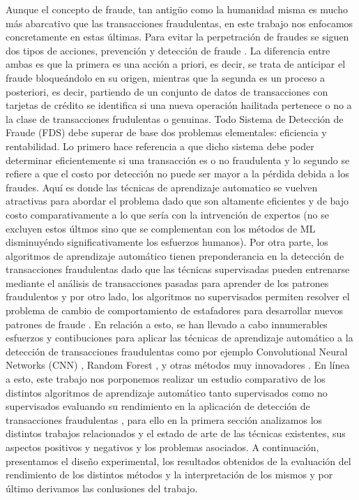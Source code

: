 \documentclass[11pt,a4paper]{article}
\begin{document}
Aunque el concepto de fraude, tan antig\"uo como la humanidad misma es mucho m\'as abarcativo que las transacciones fraudulentas, en este trabajo nos enfocamos concretamente en estas \'ultimas. Para evitar la perpetraci\'on de fraudes se siguen dos tipos de acciones, prevenci\'on y detecci\'on de fraude \cite{Pozzolo2015AdaptiveML}. La diferencia entre ambas es que la primera es una acci\'on a priori, es decir, se trata de anticipar el fraude bloque\'andolo en su origen, mientras que la segunda es un proceso a posteriori, es decir, partiendo de un conjunto de datos de transacciones con tarjetas de cr\'edito se identifica si una nueva operaci\'on hailitada pertenece o no a la clase de transacciones frudulentas o genuinas. Todo Sistema de Detecci\'on de Fraude (FDS) debe superar de base dos problemas elementales: eficiencia y rentabilidad. Lo primero hace referencia a que dicho sistema debe poder determinar eficientemente si una transacci\'on es o no fraudulenta y lo segundo se refiere a que el costo por detecci\'on no puede ser mayor a la p\'erdida debida a los fraudes. Aqu\'i es donde las t\'ecnicas de aprendizaje automatico se vuelven atractivas para abordar el problema dado que son altamente eficientes y de bajo costo comparativamente a lo que ser\'ia con la intrvenci\'on de expertos (no se excluyen estos \'ultmos sino que se complementan con los m\'etodos de ML disminuy\'endo significativamente los esfuerzos humanos). Por otra parte, los algoritmos de aprendizaje autom\'atico tienen preponderancia en la detecci\'on de transacciones fraudulentas dado que las t\'ecnicas supervisadas pueden entrenarse mediante el an\'alisis de transacciones pasadas para aprender de los patrones fraudulentos y por otro lado, los algoritmos no supervisados permiten resolver el problema de cambio de comportamiento de estafadores para desarrollar nuevos patrones de fraude \cite{carcillo2021combining}. En relaci\'on a esto, se han llevado a cabo innumerables esfuerzos y contibuciones para aplicar las t\'ecnicas de aprendizaje autom\'atico a la detecci\'on de transacciones fraudulentas como por ejemplo Convolutional Neural Networks (CNN) \cite{fu2016credit}, Random Forest \cite{xuan2018random}, y otras m\'etodos muy innovadores \cite{carta2019fraud}. En l\'inea a esto, este trabajo nos porponemos realizar un estudio comparativo de los distintos algoritmos de aprendizaje autom\'atico tanto supervisados como no supervisados evaluando su rendimiento en la aplicaci\'on de detecci\'on de transacciones fraudulentas \cite{niu2019comparison,carcillo2021combining}, para ello en la primera secci\'on analizamos los distintos trabajos relacionados y el estado de arte de las t\'ecnicas existentes, sus aspectos positivos y negativos y los problemas asociados. A continuaci\'on, presentamos el dise\~no experimental, los resultados obtenidos de la evaluaci\'on del rendimiento de los distintos m\'etodos y la interpretaci\'on de los mismos y por \'ultimo derivamos las conlusiones del trabajo.
\end{document}
